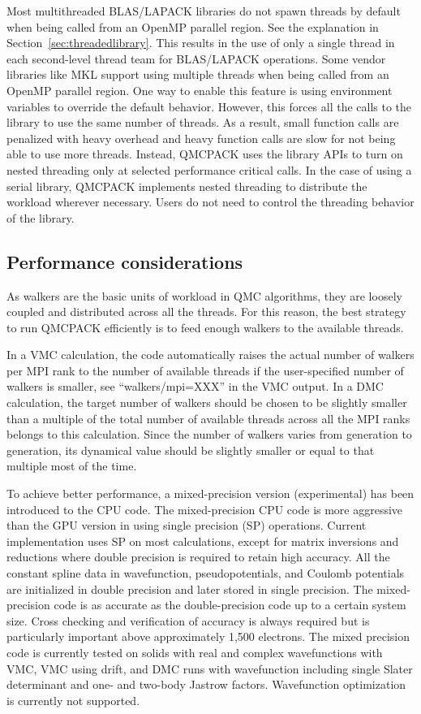 Most multithreaded BLAS/LAPACK libraries do not spawn threads by default
when being called from an OpenMP parallel region. See the explanation in Section~\ref{sec:threadedlibrary}.
This results in the use of only a single thread in each second-level thread team for BLAS/LAPACK operations.
Some vendor libraries like MKL support using multiple threads when being called from an OpenMP parallel region.
One way to enable this feature is using environment variables to override the default behavior.
However, this forces all the calls to the library to use the same number of threads.
As a result, small function calls are penalized with heavy overhead and heavy function calls are slow for not being able to use more threads.
Instead, QMCPACK uses the library APIs to turn on nested threading only at selected performance critical calls.
In the case of using a serial library, QMCPACK implements nested threading to distribute the workload wherever necessary.
Users do not need to control the threading behavior of the library.

\subsection{Performance considerations}
\label{sec:cpu:performance}
As walkers are the basic units of workload in QMC algorithms, they are loosely coupled and distributed across all the threads. For this reason, the best strategy to run QMCPACK efficiently is to feed enough walkers to the available threads.

In a VMC calculation, the code automatically raises the actual number of walkers per MPI rank to the number of available threads if the user-specified number of walkers is smaller, see ``walkers/mpi=XXX'' in the VMC output.  In a DMC calculation, the target number of walkers should be chosen to be slightly smaller than a multiple of the total number of available threads across all the MPI ranks belongs to this calculation. Since the number of walkers varies from generation to generation, its dynamical value should be slightly smaller or equal to that multiple most of the time.

To achieve better performance, a mixed-precision version (experimental) has been introduced to the CPU code. The mixed-precision CPU code is more aggressive than the GPU version in using single precision (SP) operations. Current implementation uses SP on most calculations, except for matrix inversions and reductions where double precision is required to retain high accuracy. All the constant spline data in wavefunction, pseudopotentials, and Coulomb potentials are initialized in double precision and later stored in single precision. The mixed-precision code is as accurate as the double-precision code up to a certain system size. Cross checking and verification of accuracy is always required but is particularly important above approximately 1,500 electrons. The mixed precision code is currently tested on solids with real and complex wavefunctions with VMC, VMC using drift, and DMC runs with wavefunction including single Slater determinant and one- and two-body Jastrow factors. Wavefunction optimization is currently not supported.

